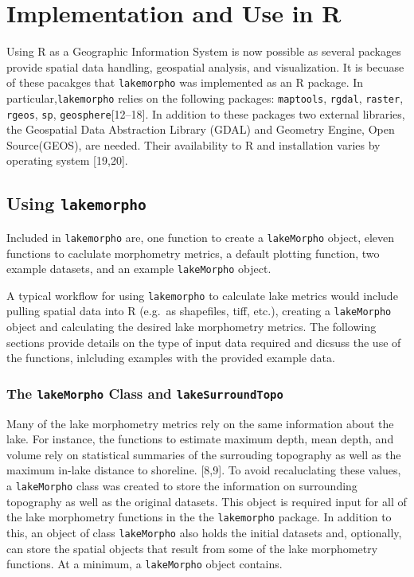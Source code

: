 \documentclass[11pt,]{article}
\begin{document}
\section{Implementation and Use in R}\label{implementation-and-use-in-r}

Using R as a Geographic Information System is now possible as several
packages provide spatial data handling, geospatial analysis, and
visualization. It is becuase of these pacakges that \texttt{lakemorpho}
was implemented as an R package. In particular,\texttt{lakemorpho}
relies on the following packages: \texttt{maptools}, \texttt{rgdal},
\texttt{raster}, \texttt{rgeos}, \texttt{sp},
\texttt{geosphere}{[}12--18{]}. In addition to these packages two
external libraries, the Geospatial Data Abstraction Library (GDAL) and
Geometry Engine, Open Source(GEOS), are needed. Their availability to R
and installation varies by operating system {[}19,20{]}.

\subsection{\texorpdfstring{Using
\texttt{lakemorpho}}{Using lakemorpho}}\label{using-lakemorpho}

Included in \texttt{lakemorpho} are, one function to create a
\texttt{lakeMorpho} object, eleven functions to caclulate morphometry
metrics, a default plotting function, two example datasets, and an
example \texttt{lakeMorpho} object.

A typical workflow for using \texttt{lakemorpho} to calculate lake
metrics would include pulling spatial data into R (e.g.~as shapefiles,
tiff, etc.), creating a \texttt{lakeMorpho} object and calculating the
desired lake morphometry metrics. The following sections provide details
on the type of input data required and dicsuss the use of the functions,
inlcluding examples with the provided example data.

\subsubsection{\texorpdfstring{The \texttt{lakeMorpho} Class and
\texttt{lakeSurroundTopo}}{The lakeMorpho Class and lakeSurroundTopo}}\label{the-lakemorpho-class-and-lakesurroundtopo}

Many of the lake morphometry metrics rely on the same information about
the lake. For instance, the functions to estimate maximum depth, mean
depth, and volume rely on statistical summaries of the surrouding
topography as well as the maximum in-lake distance to shoreline.
{[}8,9{]}. To avoid recaluclating these values, a \texttt{lakeMorpho}
class was created to store the information on surrounding topography as
well as the original datasets. This object is required input for all of
the lake morphometry functions in the the \texttt{lakemorpho} package.
In addition to this, an object of class \texttt{lakeMorpho} also holds
the initial datasets and, optionally, can store the spatial objects that
result from some of the lake morphometry functions. At a minimum, a
\texttt{lakeMorpho} object contains.
\end{document}
